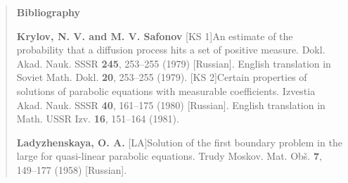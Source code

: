
\begin{quote}
\textbf{Bibliography}

\medskip

\textbf{Krylov, N. V. and M. V. Safonov}
\newline
{}[KS 1]\quad An estimate of the probability that a diffusion process hits a set of positive measure. Dokl.\newline
Akad. Nauk. SSSR \textbf{245}, 253--255 (1979) [Russian]. English translation in Soviet Math.\newline
Dokl. \textbf{20}, 253--255 (1979).
\newline
{}[KS 2]\quad Certain properties of solutions of parabolic equations with measurable coefficients. Izvestia\newline
Akad. Nauk. SSSR \textbf{40}, 161--175 (1980) [Russian]. English translation in Math. USSR Izv.\newline
\textbf{16}, 151--164 (1981).

\medskip

\textbf{Ladyzhenskaya, O. A.}
\newline
{}[LA]\quad Solution of the first boundary problem in the large for quasi-linear parabolic equations.\newline
Trudy Moskov. Mat. Ob\v{s}. \textbf{7}, 149--177 (1958) [Russian].

\medskip


\end{quote}
